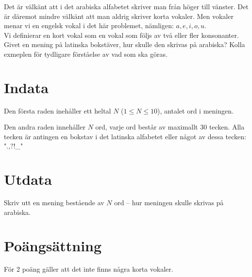 

Det är välkänt att i det arabiska alfabetet skriver man från höger till vänster. Det är däremot mindre välkänt att man aldrig skriver korta vokaler. Men vokaler menar vi en engelsk vokal i det här problemet, nämligen: $a,e,i,o,u$.\\ Vi definierar en kort vokal som en vokal som följs av två eller fler konsonanter.\\ Givet en mening på latinska bokstäver, hur skulle den skrivas på arabiska? Kolla exmeplen för tydligare förståelse av vad som ska göras.


\section*{Indata}
Den första raden inehåller ett heltal $N$ ($1 \le N \le 10$), antalet ord i meningen.

Den andra raden innehåller $N$ ord, varje ord består av maximallt 30 tecken. Alla tecken är antingen en bokstav i det latinska alfabetet eller något av dessa tecken: ".,?!\_"

\section*{Utdata}
Skriv utt en mening bestående av $N$ ord -- hur meningen skulle skrivas på arabiska.
\section*{Poängsättning}
För 2 poäng gäller att det inte finns några korta vokaler. \\
